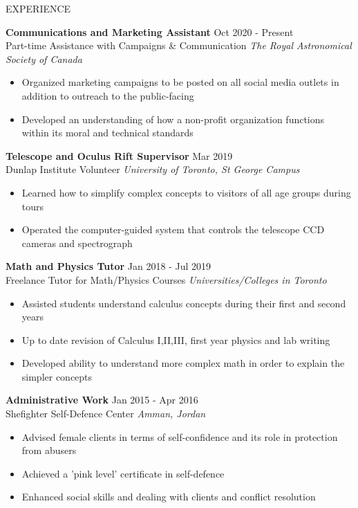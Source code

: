 \documentclass{resume} %
\begin{document}
\begin{rSection}{EXPERIENCE}

\textbf{Communications and Marketing Assistant} \hfill Oct 2020 - Present\\
Part-time Assistance with Campaigns \& Communication \hfill \textit{The Royal Astronomical Society of Canada} 
 \begin{itemize}
    \itemsep -3pt {} 
     \item Organized marketing campaigns to be posted on all social media outlets in addition to outreach to the public-facing
     \item Developed an understanding of how a non-profit organization functions within its moral and technical standards
 \end{itemize}

\textbf{Telescope and Oculus Rift Supervisor} \hfill Mar 2019\\
Dunlap Institute Volunteer \hfill \textit{University of Toronto, St George Campus}
 \begin{itemize}
    \itemsep -3pt {} 
     \item Learned how to simplify complex concepts to visitors of all age groups during tours
     \item Operated the computer-guided system that controls the telescope CCD cameras and spectrograph
 \end{itemize}
 
\textbf{Math and Physics Tutor} \hfill Jan 2018 - Jul 2019\\
Freelance Tutor for Math/Physics Courses  \hfill \textit{Universities/Colleges in Toronto}
 \begin{itemize}
    \itemsep -3pt {} 
     \item Assisted students understand calculus concepts during their first and second years
     \item Up to date revision of Calculus I,II,III, first year physics and lab writing
     \item Developed ability to understand more complex math in order to explain the simpler concepts
 \end{itemize}
 
 
\textbf{Administrative Work} \hfill Jan 2015 - Apr 2016\\
Shefighter Self-Defence Center \hfill \textit{Amman, Jordan} 

 \begin{itemize}
    \itemsep -3pt {} 
     \item Advised female clients in terms of self-confidence and its role in protection from abusers
     \item Achieved a 'pink level' certificate in self-defence
     \item Enhanced social skills and dealing with clients and conflict resolution
 \end{itemize}
 

\end{rSection} 
\end{document}
